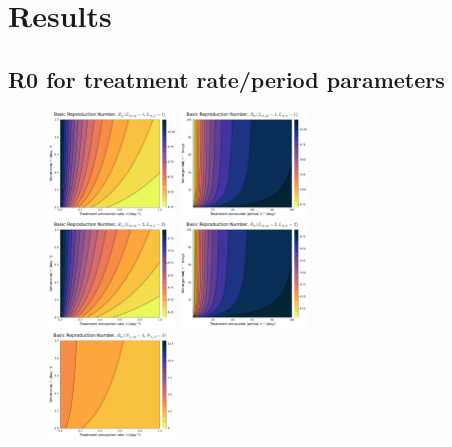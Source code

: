 \documentclass[12pt]{article}
\begin{document}
\section{Results}

\subsection{R0 for treatment rate/period parameters}

\begin{figure}[H]
    \centering
    \includegraphics[width=0.3\textwidth]{../../fig/gen_model/R0_rates_txh_1x1.pdf}
    \includegraphics[width=0.3\textwidth]{../../fig/gen_model/R0_periods_txh_1x1.pdf}\\
    \includegraphics[width=0.3\textwidth]{../../fig/gen_model/R0_rates_txh_2x2.pdf}
    \includegraphics[width=0.3\textwidth]{../../fig/gen_model/R0_periods_txh_2x2.pdf}\\
    \includegraphics[width=0.3\textwidth]{../../fig/gen_model/R0_rates_txh_5x5.pdf}

\end{figure}
\end{document}
